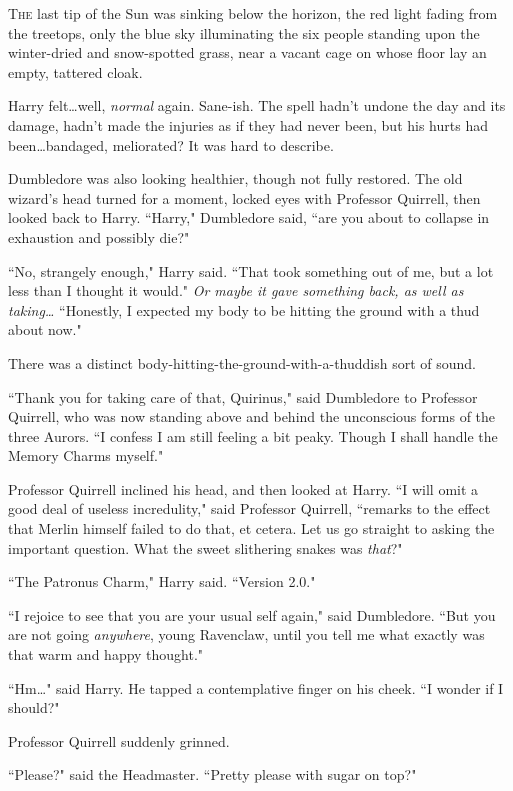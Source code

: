 
\lettrine{T}{he} last tip of the Sun was sinking below the horizon, the red light fading from the treetops, only the blue sky illuminating the six people standing upon the winter-dried and snow-spotted grass, near a vacant cage on whose floor lay an empty, tattered cloak.

Harry felt…well, \emph{normal} again. Sane-ish. The spell hadn't undone the day and its damage, hadn't made the injuries as if they had never been, but his hurts had been…bandaged, meliorated? It was hard to describe.

Dumbledore was also looking healthier, though not fully restored. The old wizard's head turned for a moment, locked eyes with Professor Quirrell, then looked back to Harry. ``Harry," Dumbledore said, ``are you about to collapse in exhaustion and possibly die?"

``No, strangely enough," Harry said. ``That took something out of me, but a lot less than I thought it would." \emph{Or maybe it gave something back, as well as taking…} ``Honestly, I expected my body to be hitting the ground with a thud about now."

There was a distinct body-hitting-the-ground-with-a-thuddish sort of sound.

``Thank you for taking care of that, Quirinus," said Dumbledore to Professor Quirrell, who was now standing above and behind the unconscious forms of the three Aurors. ``I confess I am still feeling a bit peaky. Though I shall handle the Memory Charms myself."

Professor Quirrell inclined his head, and then looked at Harry. ``I will omit a good deal of useless incredulity," said Professor Quirrell, ``remarks to the effect that Merlin himself failed to do that, et cetera. Let us go straight to asking the important question. What the sweet slithering snakes was \emph{that}?"

``The Patronus Charm," Harry said. ``Version 2.0."

``I rejoice to see that you are your usual self again," said Dumbledore. ``But you are not going \emph{anywhere}, young Ravenclaw, until you tell me what exactly was that warm and happy thought."

``Hm…" said Harry. He tapped a contemplative finger on his cheek. ``I wonder if I should?"

Professor Quirrell suddenly grinned.

``Please?" said the Headmaster. ``Pretty please with sugar on top?"

